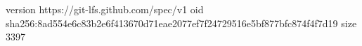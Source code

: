 version https://git-lfs.github.com/spec/v1
oid sha256:8ad554e6c83b2e6f413670d71eae2077ef7f24729516e5bf877bfc874f4f7d19
size 3397
